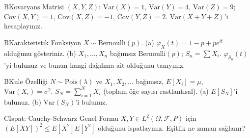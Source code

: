 \begin{alistirma}[Al.4.8]{B}{Kovaryans Matrisi}
$(X, Y, Z)$: $\mathrm{Var}(X) = 1$, $\mathrm{Var}(Y) = 4$, $\mathrm{Var}(Z) = 9$;
$\mathrm{Cov}(X,Y) = 1$, $\mathrm{Cov}(X,Z) = -1$, $\mathrm{Cov}(Y,Z) = 2$.
$\mathrm{Var}(X + Y + Z)$'i hesaplayınız.
\end{alistirma}

\begin{alistirma}[Al.4.9]{B}{Karakteristik Fonksiyon}
$X \sim \mathrm{Bernoulli}(p)$.
(a) $\varphi_X(t) = 1 - p + pe^{it}$ olduğunu gösteriniz.
(b) $X_1, \ldots, X_n$ bağımsız $\mathrm{Bernoulli}(p)$; $S_n = \sum X_i$.
$\varphi_{S_n}(t)$'yi bulunuz ve bunun hangi dağılıma ait olduğunu tanıyınız.
\end{alistirma}

\begin{alistirma}[Al.4.10]{B}{Kule Özelliği}
$N \sim \mathrm{Pois}(\lambda)$ ve $X_1, X_2, \ldots$ bağımsız, $E[X_i] = \mu$, $\mathrm{Var}(X_i) = \sigma^2$.
$S_N = \sum_{i=1}^N X_i$ (toplam öğe sayısı rastlantısal).
(a) $E[S_N]$'i bulunuz. (b) $\mathrm{Var}(S_N)$'i bulunuz.
\end{alistirma}

\begin{alistirma}[Al.4.11]{C}{İspat: Cauchy-Schwarz Genel Formu}
$X, Y \in L^2(\Omega, \mathcal{F}, P)$ için $(E[XY])^2 \leq E[X^2] E[Y^2]$ olduğunu ispatlayınız.
Eşitlik ne zaman sağlanır?
\end{alistirma}

